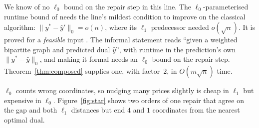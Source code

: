 We know of no $\ell_0$ bound on the repair step in this line. The
$\ell_0$-parameterised runtime bound of \citet{chen2022} needs the line's mildest condition to
improve on the classical algorithm: $\|y^*-\hat y'\|_0 = o(n)$, where its $\ell_1$
predecessor needed $o(\sqrt{n})$. It is proved for a \emph{feasible} input
\citep[Thm.~3.2]{chen2022}. The informal statement \citep[Thm.~1.1]{chen2022} reads ``given a
weighted bipartite graph and predicted dual $\hat y$'', with runtime in the prediction's own
$\|y^* - \hat y\|_0$, and making it formal needs an $\ell_0$ bound on the repair step.
Theorem~\ref{thm:composed} supplies one, with factor~$2$, in $O(m\sqrt{n})$ time.

$\ell_0$ counts wrong coordinates, so nudging many prices slightly is cheap in $\ell_1$ but expensive in
$\ell_0$. Figure~\ref{fig:star} shows two orders of one repair that agree on the gap and both $\ell_1$
distances but end $4$ and $1$ coordinates from the nearest optimal dual.

